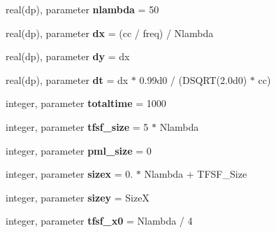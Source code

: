 \begin{DoxyCompactItemize}
\item 
\hypertarget{namespacefdtd__constants_a779a79a9c5a05cf3147306603051e596}{}real(dp), parameter {\bfseries nlambda} = 50\label{namespacefdtd__constants_a779a79a9c5a05cf3147306603051e596}

\item 
\hypertarget{namespacefdtd__constants_ac6056f1e3aadc3a3813a2b443270549d}{}real(dp), parameter {\bfseries dx} = (cc / freq) / Nlambda\label{namespacefdtd__constants_ac6056f1e3aadc3a3813a2b443270549d}

\item 
\hypertarget{namespacefdtd__constants_a079744a2a5481f29701d99600d3f0cbb}{}real(dp), parameter {\bfseries dy} = dx\label{namespacefdtd__constants_a079744a2a5481f29701d99600d3f0cbb}

\item 
\hypertarget{namespacefdtd__constants_af0cfa5aea2a346926b5d14929a4f9d0c}{}real(dp), parameter {\bfseries dt} = dx $\ast$ 0.\+99d0 / (\+D\+S\+Q\+R\+T(2.\+0d0) $\ast$ cc)\label{namespacefdtd__constants_af0cfa5aea2a346926b5d14929a4f9d0c}

\item 
\hypertarget{namespacefdtd__constants_a017e6aaca6c400a1ee5616177f9dadf8}{}integer, parameter {\bfseries totaltime} = 1000\label{namespacefdtd__constants_a017e6aaca6c400a1ee5616177f9dadf8}

\item 
\hypertarget{namespacefdtd__constants_a5e2b96d424051ed4a5cadf6a8b51dc34}{}integer, parameter {\bfseries tfsf\+\_\+size} = 5 $\ast$ Nlambda\label{namespacefdtd__constants_a5e2b96d424051ed4a5cadf6a8b51dc34}

\item 
\hypertarget{namespacefdtd__constants_a69fc59482c127beee9ec8f3421f7164c}{}integer, parameter {\bfseries pml\+\_\+size} = 0\label{namespacefdtd__constants_a69fc59482c127beee9ec8f3421f7164c}

\item 
\hypertarget{namespacefdtd__constants_a744843abc91bea13f4021929ff7e0821}{}integer, parameter {\bfseries sizex} = 0. $\ast$ Nlambda + T\+F\+S\+F\+\_\+\+Size\label{namespacefdtd__constants_a744843abc91bea13f4021929ff7e0821}

\item 
\hypertarget{namespacefdtd__constants_a2e0af201d0abefaeac3169c9602bd609}{}integer, parameter {\bfseries sizey} = Size\+X\label{namespacefdtd__constants_a2e0af201d0abefaeac3169c9602bd609}

\item 
\hypertarget{namespacefdtd__constants_af1ba0830799634b4d3879bca118333ae}{}integer, parameter {\bfseries tfsf\+\_\+x0} = Nlambda / 4\label{namespacefdtd__constants_af1ba0830799634b4d3879bca118333ae}


\end{DoxyCompactItemize}
